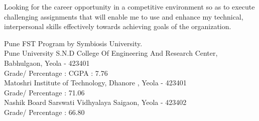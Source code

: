 \documentclass[
	a4paper,
]{fortysecondscv}
\begin{document}
\makefrontsidebar

\cvsection{}

Looking for the career opportunity in a competitive environment so as to execute challenging assignments that will enable me to use and enhance my technical, interpersonal skills effectively towards achieving goals of the organization.


\begin{cvtable}[1.5]
    
     {Pune} {FST Program by Symbiosis University. }\\
    
	 {Pune University }
		{S.N.D College Of Engineering And Research Center, Babhulgaon, Yeola - 423401 \\
		Grade/ Percentage : CGPA : 7.76 }\\ 
		{Matoshri Institute of Technology, Dhanore , Yeola - 423401 \\
		Grade/ Percentage : 71.06 }\\
	 {Nashik Board}
		{Sarswati Vidhyalaya Saigaon, Yeola - 423402 \\
		Grade/ Percentage : 66.80 }\\	
\end{cvtable}
\end{document}
